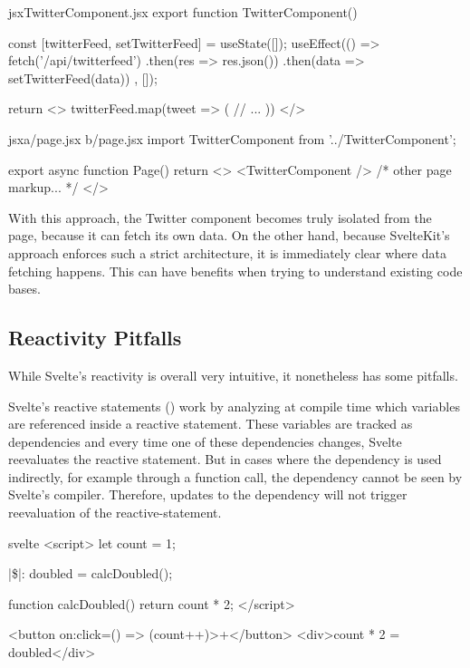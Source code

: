 \begin{listing}[H]
\begin{myminted}{jsx}{TwitterComponent.jsx}
export function TwitterComponent() {
  const [twitterFeed, setTwitterFeed] = useState([]);
  useEffect(() => {
    fetch('/api/twitterfeed')
      .then(res => res.json())
      .then(data => setTwitterFeed(data))
  }, []);

  return <>
    {twitterFeed.map(tweet => (
      // ...
    ))}
  </>
}
\end{myminted}
\begin{myminted}{jsx}{a/page.jsx b/page.jsx}
import TwitterComponent from '../TwitterComponent';

export async function Page() {
  return <>
    <TwitterComponent />
    { /* other page markup... */ }
  </>
}
\end{myminted}
\caption{Example of a reusable component using React server components.}
\label{fig:evaluation-reusable-rsc}
\end{listing}

With this approach, the Twitter component becomes truly isolated from the page, because it can fetch its own data. On the other hand, because SvelteKit's approach enforces such a strict architecture, it is immediately clear where data fetching happens. This can have benefits when trying to understand existing code bases.


\subsection{Reactivity Pitfalls}
\label{sec:evaluation-reactivity pitfalls}
While Svelte's reactivity is overall very intuitive, it nonetheless has some pitfalls.

Svelte's reactive statements () work by analyzing at compile time which variables are referenced inside a reactive statement. These variables are tracked as dependencies and every time one of these dependencies changes, Svelte reevaluates the reactive statement. But in cases where the dependency is used indirectly, for example through a function call, the dependency cannot be seen by Svelte's compiler. Therefore, updates to the dependency will not trigger reevaluation of the reactive-statement.

\begin{listing}[h!]
\begin{myminted}[escapeinside=||, autogobble]{svelte}{}
<script>
  let count = 1;

  |\$|: doubled = calcDoubled();

  function calcDoubled() {
    return count * 2;
  }
</script>

<button on:click={() => (count++)}>+</button>
<div>{count} * 2 = {doubled}</div>
\end{myminted}
\caption{\texttt{doubled} will not be recalculated when \texttt{count} changes.}
\label{fig:evaluation-reactivity-hidden-dependency}
\end{listing}

